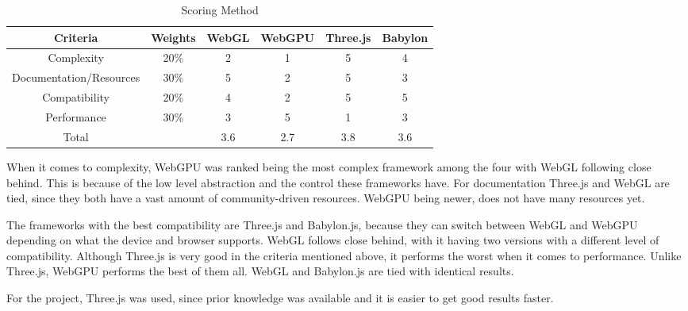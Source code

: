 \begin{table}[ht!]
    \centering
    \begin{tabular}{c|c|c|c|c|c} %
    \hline %
    Criteria & Weights & WebGL & WebGPU & Three.js & Babylon \\
    \hline %
    Complexity & 20\% & 2 & 1 & 5 & 4 \\
    Documentation/Resources & 30\% & 5 & 2 & 5 & 3 \\
    Compatibility & 20\% & 4 & 2 & 5 & 5 \\
    Performance & 30\% & 3 & 5 & 1 & 3 \\
    \hline %
    Total &  & 3.6 & 2.7 & 3.8 & 3.6 \\
    \hline %
    \end{tabular}
    \caption{Scoring Method}
\end{table}

When it comes to complexity, WebGPU was ranked being the most complex framework among the four with WebGL following close behind. This is because of the low level abstraction and the control these frameworks have. For documentation Three.js and WebGL are tied, since they both have a vast amount of community-driven resources. WebGPU being newer, does not have many resources yet. 

The frameworks with the best compatibility are Three.js and Babylon.js, because they can switch between WebGL and WebGPU depending on what the device and browser supports. WebGL follows close behind, with it having two versions with a different level of compatibility. Although Three.js is very good in the criteria mentioned above, it performs the worst when it comes to performance. Unlike Three.js, WebGPU performs the best of them all. WebGL and Babylon.js are tied with identical results.

For the project, Three.js was used, since prior knowledge was available and it is easier to get good results faster.